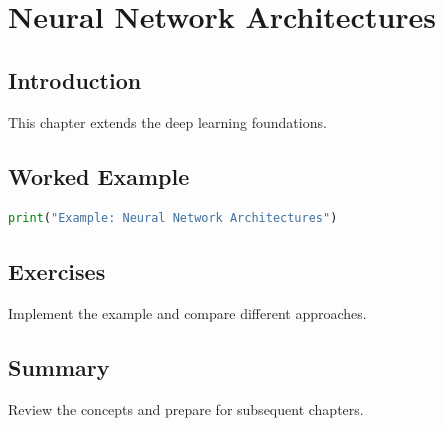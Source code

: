 \chapter{Neural Network Architectures}
\label{chap:vol7-8}



\section{Introduction}
This chapter extends the deep learning foundations.

\section{Worked Example}
\begin{lstlisting}[language=Python]
print("Example: Neural Network Architectures")
\end{lstlisting}

\section{Exercises}
\begin{exercise}
Implement the example and compare different approaches.
\end{exercise}

\section{Summary}
Review the concepts and prepare for subsequent chapters.
